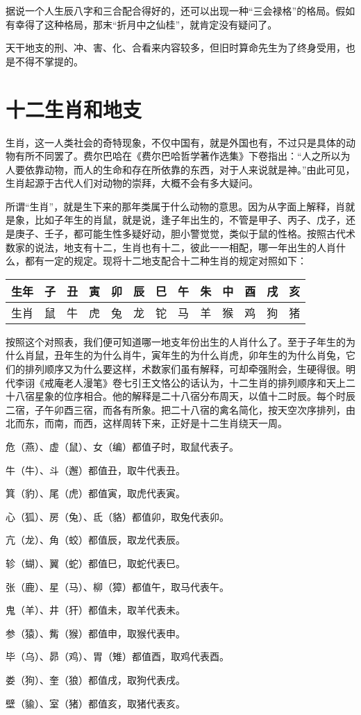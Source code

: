 \documentclass[a5paper,oneside,12pt]{ctexbook}
\begin{document}
据说一个人生辰八字和三合配合得好的，还可以出现一种“三会禄格”的格局。假如有幸得了这种格局，那末“折月中之仙桂”，就肯定没有疑问了。

天干地支的刑、冲、害、化、合看来内容较多，但旧时算命先生为了终身受用，也是不得不掌提的。


\section{十二生肖和地支}
生肖，这一人类社会的奇特现象，不仅中国有，就是外国也有，不过只是具体的动物有所不同罢了。费尔巴哈在《费尔巴哈哲学著作选集》下卷指出：“人之所以为人要依靠动物，而人的生命和存在所依靠的东西，对于人来说就是神。”由此可见，生肖起源于古代人们对动物的崇拜，大概不会有多大疑问。

所谓“生肖”，就是生下来的那年类属于什么动物的意思。因为从字面上解释，肖就是象，比如子年生的肖鼠，就是说，逢子年出生的，不管是甲子、丙子、戊子，还是庚子、壬子，都可能生性多疑好动，胆小警觉觉，类似于鼠的性格。按照古代术数家的说法，地支有十二，生肖也有十二，彼此一一相配，哪一年出生的人肖什么，都有一定的规定。现将十二地支配合十二种生肖的规定对照如下：
\begin{table}[H]
\centering
\begin{tabular}{*{12}{c|}c}
\hline
生年&子&丑&寅&卯&辰&巳&午&朱&中&酉&戌&亥\\
\hline
生肖&鼠&牛&虎&兔&龙&铊&马&羊&猴&鸡&狗&猪\\
\hline
\end{tabular}
\end{table}

按照这个对照表，我们便可知道哪一地支年份出生的人肖什么了。至于子年生的为什么肖鼠，丑年生的为什么肖牛，寅年生的为什么肖虎，卯年生的为什么肖兔，它们的排列顺序又为什么要这样，术数家们虽有解释，可却牵强附会，生硬得很。明代李诩《戒庵老人漫笔》卷七引王文恪公的话认为，十二生肖的排列顺序和天上二十八宿星象的位序相合。他的解释是二十八宿分布周天，以值十二时辰。每个时辰二宿，子午卯酉三宿，而各有所象。把二十八宿的禽名简化，按天空次序排列，由北而东，而南，而西，这样周转下来，正好是十二生肖绕天一周。

危（燕）、虚（鼠）、女（编）都值子时，取鼠代表子。\par
牛（牛）、斗（邂）都值丑，取牛代表丑。\par
箕（豹）、尾（虎）都值寅，取虎代表寅。\par
心（狐）、房（兔）、氐（貉）都值卯，取兔代表卯。\par
亢（龙）、角（蛟）都值辰，取龙代表辰。\par
轸（蝴）、翼（蛇）都值巳，取蛇代表巳。\par
张（鹿）、星（马）、柳（獐）都值午，取马代表午。\par
鬼（羊）、井（犴）都值未，取羊代表未。\par
参（猿）、觜（猴）都值申，取猴代表申。\par
毕（乌）、昴（鸡）、胃（雉）都值酉，取鸡代表酉。\par
娄（狗）、奎（狼）都值戌，取狗代表戌。\par
壁（貐）、室（猪）都值亥，取猪代表亥。
\end{document}
